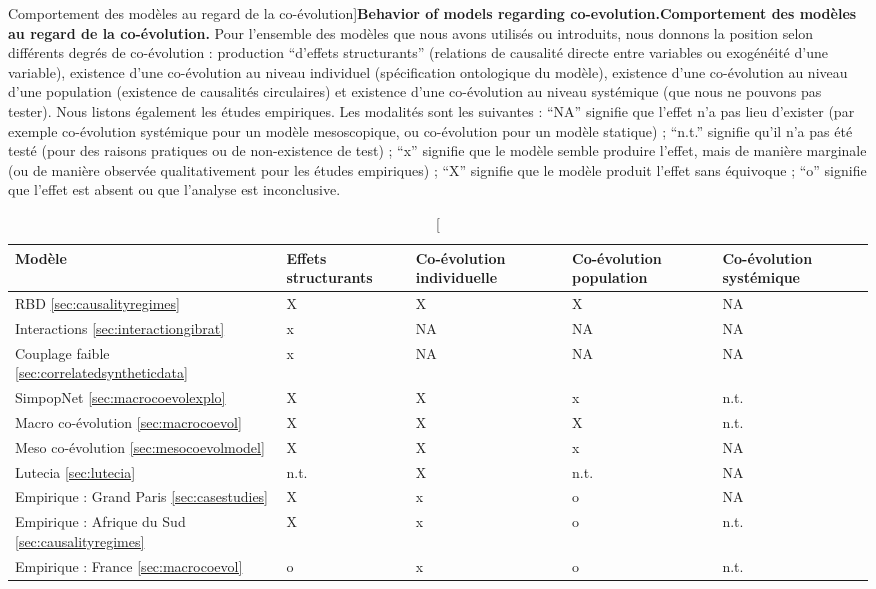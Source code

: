 \begin{table}
\caption[Behavior of models regarding co-evolution][Comportement des modèles au regard de la co-évolution]{\textbf{Behavior of models regarding co-evolution.}\label{tab:contributions:models}}{\textbf{Comportement des modèles au regard de la co-évolution.} Pour l'ensemble des modèles que nous avons utilisés ou introduits, nous donnons la position selon différents degrés de co-évolution : production ``d'effets structurants'' (relations de causalité directe entre variables ou exogénéité d'une variable), existence d'une co-évolution au niveau individuel (spécification ontologique du modèle), existence d'une co-évolution au niveau d'une population (existence de causalités circulaires) et existence d'une co-évolution au niveau systémique (que nous ne pouvons pas tester). Nous listons également les études empiriques. Les modalités sont les suivantes : ``NA'' signifie que l'effet n'a pas lieu d'exister (par exemple co-évolution systémique pour un modèle mesoscopique, ou co-évolution pour un modèle statique) ; ``n.t.'' signifie qu'il n'a pas été testé (pour des raisons pratiques ou de non-existence de test) ; ``x'' signifie que le modèle semble produire l'effet, mais de manière marginale (ou de manière observée qualitativement pour les études empiriques) ; ``X'' signifie que le modèle produit l'effet sans équivoque ; ``o'' signifie que l'effet est absent ou que l'analyse est inconclusive.\label{tab:contributions:models}}
\begin{tabular}[6pt]{|p{4cm}|p{2.5cm}|p{2.5cm}|p{2.5cm}|p{2.5cm}|}
\hline
Modèle & Effets structurants & Co-évolution individuelle &  Co-évolution population & Co-évolution systémique \\\hline
RBD \ref{sec:causalityregimes} & X & X & X & NA \\\hline
Interactions \ref{sec:interactiongibrat} & x & NA & NA & NA \\\hline
Couplage faible \ref{sec:correlatedsyntheticdata} & x & NA & NA & NA \\\hline
SimpopNet \ref{sec:macrocoevolexplo} & X & X & x & n.t. \\\hline
Macro co-évolution \ref{sec:macrocoevol} & X & X & X & n.t. \\\hline
Meso co-évolution \ref{sec:mesocoevolmodel} & X & X & x & NA\\\hline
Lutecia \ref{sec:lutecia} & n.t. & X & n.t. & NA\\\hline
Empirique : Grand Paris \ref{sec:casestudies} & X & x & o & NA\\\hline
Empirique : Afrique du Sud \ref{sec:causalityregimes} & X & x & o & n.t.\\\hline
Empirique : France \ref{sec:macrocoevol} & o & x & o & n.t.\\\hline
\end{tabular}
\end{table}


